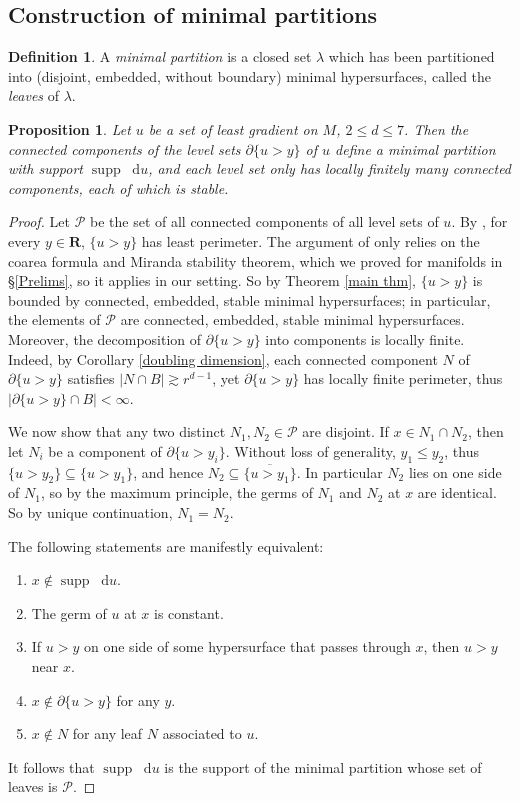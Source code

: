 \documentclass[reqno,10pt]{amsart}
\newcommand{\RR}{\mathbf{R}}
\DeclareMathOperator{\supp}{supp}
\newcommand*\dif{\mathop{}\!\mathrm{d}}
\newcommand{\dfn}[1]{\emph{#1}\index{#1}}
\newtheorem{proposition}[theorem]{Proposition}
\theoremstyle{definition}
\newtheorem{definition}[theorem]{Definition}
\numberwithin{equation}{section}
\begin{document}
\subsection{Construction of minimal partitions}
\begin{definition}
A \dfn{minimal partition} is a closed set $\lambda$ which has been partitioned into (disjoint, embedded, without boundary) minimal hypersurfaces, called the \dfn{leaves} of $\lambda$. 
\end{definition}

\begin{proposition}\label{construction of minimal partitions}
Let $u$ be a set of least gradient on $M$, $2 \leq d \leq 7$.
Then the connected components of the level sets $\partial \{u > y\}$ of $u$ define a minimal partition with support $\supp \dif u$, and each level set only has locally finitely many connected components, each of which is stable.
\end{proposition}
\begin{proof}
Let $\mathscr P$ be the set of all connected components of all level sets of $u$.
By \cite[Theorem 1]{BOMBIERI1969}, for every $y \in \RR$, $\{u > y\}$ has least perimeter.
The argument of \cite{BOMBIERI1969} only relies on the coarea formula and Miranda stability theorem, which we proved for manifolds in \S\ref{Prelims}, so it applies in our setting.
So by Theorem \ref{main thm}, $\{u > y\}$ is bounded by connected, embedded, stable minimal hypersurfaces; in particular, the elements of $\mathscr P$ are connected, embedded, stable minimal hypersurfaces.
Moreover, the decomposition of $\partial \{u > y\}$ into components is locally finite.
Indeed, by Corollary \ref{doubling dimension}, each connected component $N$ of $\partial \{u > y\}$ satisfies $|N \cap B| \gtrsim r^{d - 1}$, yet $\partial \{u > y\}$ has locally finite perimeter, thus $|\partial \{u > y\} \cap B| < \infty$.

We now show that any two distinct $N_1, N_2 \in \mathscr P$ are disjoint.
If $x \in N_1 \cap N_2$, then let $N_i$ be a component of $\partial \{u > y_i\}$.
Without loss of generality, $y_1 \leq y_2$, thus $\{u > y_2\} \subseteq \{u > y_1\}$, and hence $N_2 \subseteq \overline{\{u > y_1\}}$.
In particular $N_2$ lies on one side of $N_1$, so by the maximum principle, the germs of $N_1$ and $N_2$ at $x$ are identical.
So by unique continuation, $N_1 = N_2$.

The following statements are manifestly equivalent:
\begin{enumerate}
\item $x \notin \supp \dif u$.
\item The germ of $u$ at $x$ is constant.
\item If $u > y$ on one side of some hypersurface that passes through $x$, then $u > y$ near $x$.
\item $x \notin \partial \{u > y\}$ for any $y$.
\item $x \notin N$ for any leaf $N$ associated to $u$.
\end{enumerate}
It follows that $\supp \dif u$ is the support of the minimal partition whose set of leaves is $\mathscr P$.
\end{proof}
\end{document}
